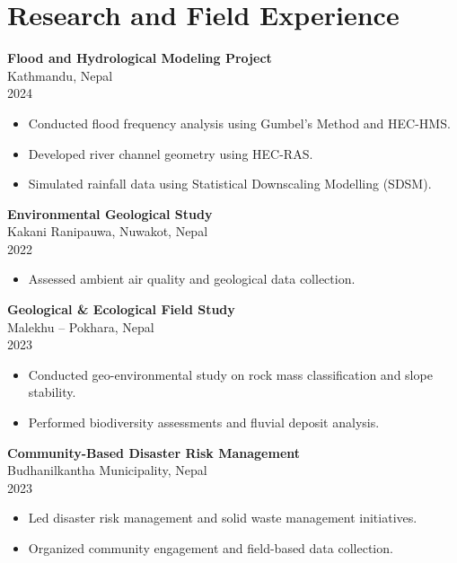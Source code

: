 \documentclass[a4paper,10pt]{article}
\begin{document}
\section*{Research and Field Experience}

\begin{multicols}{2}

\noindent
\textbf{Flood and Hydrological Modeling Project} \\
Kathmandu, Nepal \\
2024 \\
\begin{itemize}
    \item Conducted flood frequency analysis using Gumbel’s Method and HEC-HMS.
    \item Developed river channel geometry using HEC-RAS.
    \item Simulated rainfall data using Statistical Downscaling Modelling (SDSM).
\end{itemize}
\vspace{0.1cm}
\noindent
\textbf{Environmental Geological Study} \\
Kakani Ranipauwa, Nuwakot, Nepal \\
2022 \\
\begin{itemize}
    \item Assessed ambient air quality and geological data collection.
\end{itemize}

\noindent
\textbf{Geological \& Ecological Field Study} \\
Malekhu – Pokhara, Nepal \\
2023 \\
\begin{itemize}
    \item Conducted geo-environmental study on rock mass classification and slope stability.
    \item Performed biodiversity assessments and fluvial deposit analysis.
\end{itemize}

\noindent
\textbf{Community-Based Disaster Risk Management} \\
Budhanilkantha Municipality, Nepal \\
2023 \\
\begin{itemize}
    \item Led disaster risk management and solid waste management initiatives.
    \item Organized community engagement and field-based data collection.
\end{itemize}

\end{multicols}
\end{document}
